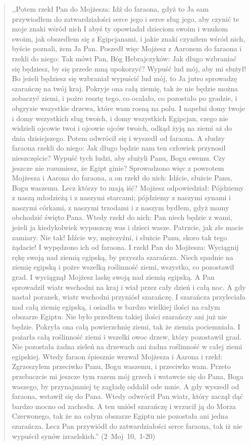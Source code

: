 \documentclass[10pt,a4paper,oneside]{article}
\begin{document}
\begin{quote}
,,Potem rzekł Pan do Mojżesza: Idź do faraona, gdyż to Ja sam przywiodłem do zatwardziałości serce jego i serce sług jego, aby czynić te moje znaki wśród nich I abyś ty opowiadał dzieciom swoim i wnukom swoim, jak obszedłem się z Egipcjanami, i jakie znaki czyniłem wśród nich, byście poznali, żem Ja Pan. Poszedł więc Mojżesz z Aaronem do faraona i rzekli do niego: Tak mówi Pan, Bóg Hebrajczyków: Jak długo wzbraniać się będziesz, by się przede mną upokorzyć? Wypuść lud mój, aby mi służył! Bo jeżeli będziesz się wzbraniał wypuścić lud mój, to Ja jutro sprowadzę szarańczę na twój kraj. Pokryje ona całą ziemię, tak że nie będzie można zobaczyć ziemi, i pożre resztę tego, co ocalało, co pozostało po gradzie, i obgryzie wszystkie drzewa, które wam rosną na polu. I napełni domy twoje i domy wszystkich sług twoich, i domy wszystkich Egipcjan, czego nie widzieli ojcowie twoi i ojcowie ojców twoich, odkąd żyją na ziemi aż do dnia dzisiejszego. Potem odwrócił się i wyszedł od faraona. A słudzy faraona rzekli do niego: Jak długo będzie nam ten człowiek przynosił nieszczęście? Wypuść tych ludzi, aby służyli Panu, Bogu swemu. Czy jeszcze nie rozumiesz, że Egipt ginie? Sprowadzono więc z powrotem Mojżesza i Aarona do faraona, a on rzekł do nich: Idźcie, służcie Panu, Bogu waszemu. Lecz którzy to mają iść? Mojżesz odpowiedział: Pójdziemy z naszą młodzieżą i z naszymi starcami; pójdziemy z naszymi synami i naszymi córkami, z naszymi trzodami i z naszym bydłem, gdyż mamy obchodzić święto Pana. Wtedy rzekł do nich: Pan niech będzie z wami, jeżeli ja kiedykolwiek wypuszczę was i dzieci wasze. Patrzcie, jak złe macie zamiary. Nie tak! Idźcie wy, mężczyźni, i służcie Panu, skoro tak tego żądacie! I wypędzono ich od faraona. I rzekł Pan do Mojżesza: Wyciągnij rękę swoją nad ziemią egipską, by przyszła szarańcza. Niech spadnie na ziemię egipską i pożre wszelką roślinność ziemi, wszystko, co pozostawił grad. I wyciągnął Mojżesz laskę swoją nad ziemią egipską. A Pan sprowadził wiatr wschodni na kraj i wiał przez cały dzień i całą noc. A gdy nastał poranek, wiatr wschodni przyniósł szarańczę. I szarańcza przyleciała nad całą ziemię egipską, i osiadła w bardzo wielkiej ilości na całym obszarze Egiptu. Nie było przedtem takiej ilości szarańczy ani już nie będzie. Pokryła ona całą powierzchnię ziemi, tak że ziemia pociemniała. I pożarła całą roślinność ziemi i wszelki owoc drzew, który pozostawił grad. Nie pozostała żadna zieleń na drzewach ani żadna roślinność w całej ziemi egipskiej. Wtedy faraon śpiesznie wezwał Mojżesza i Aarona i rzekł: Zgrzeszyłem przeciwko Panu, Bogu waszemu, i przeciwko wam. Przeto przebaczcie mi jeszcze tym razem mój grzech i wstawcie się do Pana, Boga waszego, by przynajmniej tę zagładę oddalił ode mnie. A gdy wyszedł od faraona, wstawił się do Pana. Wtedy odwrócił Pan wiatr, który zaczął dąć bardzo mocno od zachodu. A ten uniósł szarańczę i wrzucił ją do Morza Czerwonego, tak że na całym obszarze Egiptu nie pozostała ani jedna szarańcza. Lecz Pan przywiódł do zatwardziałości serce faraona, tak iż nie wypuścił synów izraelskich.'' (2~Moj~10,~1-20)
\end{quote}
\end{document}
